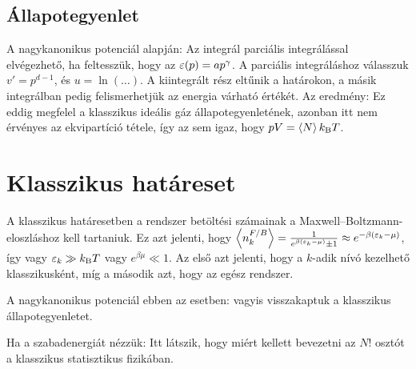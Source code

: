   \subsection{Állapotegyenlet}
   
   A nagykanonikus potenciál alapján:
   Az integrál parciális integrálással elvégezhető, ha feltesszük, hogy az $\varepsilon(p)=a p^\gamma$. A parciális integráláshoz válasszuk $v'=p^{d-1}$, és $u=\ln(\dots)$. A kiintegrált rész eltűnik a határokon, a másik integrálban pedig felismerhetjük az energia várható értékét. Az eredmény:
   Ez eddig megfelel a klasszikus ideális gáz állapotegyenletének, azonban itt nem érvényes az ekvipartíció tétele, így az sem igaz, hogy $pV=\left\langle N\right\rangle k_\text{B} T$.
   
 \section{Klasszikus határeset}
  
  A klasszikus határesetben a rendszer betöltési számainak a Maxwell--Boltzmann-eloszláshoz kell tartaniuk. Ez azt jelenti, hogy $\left\langle n^{F/B}_k\right\rangle=\frac{1}{e^{\beta(\varepsilon_k-\mu)}\pm 1}\approx e^{-\beta(\varepsilon_k-\mu)}$, így vagy $\varepsilon_k\gg k_\text{B} T$ vagy $e^{\beta\mu}\ll 1$. Az első azt jelenti, hogy a $k$-adik nívó kezelhető klasszikusként, míg a második azt, hogy az egész rendszer. 
  
  A nagykanonikus potenciál ebben az esetben:
  vagyis visszakaptuk a klasszikus állapotegyenletet.
  
  Ha a szabadenergiát nézzük:
  Itt látszik, hogy miért kellett bevezetni az $N!$ osztót a klasszikus statisztikus fizikában.
  
